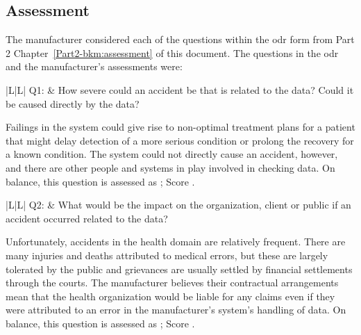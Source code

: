 \subsection{ Assessment}
The manufacturer considered each of the questions within the \gls{odr} form from Part 2 Chapter~\autoref{Part2-bkm:assessment} of this document.
The questions in the \gls{odr} and the manufacturer's assessments were:


\addtocounter{table}{-1} %
\begin{longtable*}[H]
	{|L{}|L{}|}
	\hline
	Q1: & How severe could an accident be that is related to the data? Could it be caused directly by the data?\\
	\hline
\end{longtable*}

Failings in the system could give rise to non-optimal treatment plans for a patient that might delay detection of a more serious condition or prolong the recovery for a known condition. The system could not directly cause an accident, however, and there are other people and systems in play involved in checking data. On balance, this question is assessed as ; Score .

\addtocounter{table}{-1} %
\begin{longtable*}[H]
	{|L{}|L{}|}
	\hline
	Q2: & What would be the impact on the organization, client or public if an accident occurred related to the data?\\
	\hline
\end{longtable*}

Unfortunately, accidents in the health domain are relatively frequent. There are many injuries and deaths attributed to medical errors, but these are largely tolerated by the public and grievances are usually settled  by financial settlements through the courts. The manufacturer believes their contractual arrangements mean that the health organization would be liable for any claims even if they were attributed to an error in the manufacturer's system's handling of data. On balance, this question is assessed as ; Score .

